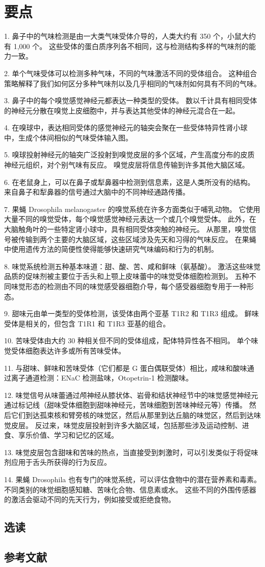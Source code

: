 \section{要点}

1. 鼻子中的气味检测是由一大类气味受体介导的，人类大约有 350 个，小鼠大约有 1,000 个。 这些受体的蛋白质序列各不相同，这与检测结构多样的气味剂的能力一致。 

2. 单个气味受体可以检测多种气味，不同的气味激活不同的受体组合。 这种组合策略解释了我们如何区分多种气味剂以及几乎相同的气味剂如何具有不同的气味。 

3. 鼻子中的每个嗅觉感觉神经元都表达一种类型的受体。 数以千计具有相同受体的神经元分散在嗅觉上皮细胞中，并与表达其他受体的神经元混合在一起。 

4. 在嗅球中，表达相同受体的感觉神经元的轴突会聚在一些受体特异性肾小球中，生成个体间相似的气味受体输入图。 

5. 嗅球投射神经元的轴突广泛投射到嗅觉皮层的多个区域，产生高度分布的皮质神经元组织，对个别气味有反应。 嗅觉皮层将信息传输到许多其他大脑区域。 

6. 在老鼠身上，可以在鼻子或犁鼻器中检测到信息素，这是人类所没有的结构。 来自鼻子和犁鼻器的信号通过大脑中的不同神经通路传播。 

7. 果蝇 Drosophila melanogaster 的嗅觉系统在许多方面类似于哺乳动物。 它使用大量不同的嗅觉受体，每个嗅觉感觉神经元表达一个或几个嗅觉受体。 此外，在大脑触角叶的一些特定肾小球中，具有相同受体突触的神经元。 从那里，嗅觉信号被传输到两个主要的大脑区域，这些区域涉及先天和习得的气味反应。 在果蝇中使用遗传方法的简便性使得能够快速研究气味编码和行为的机制。 

8. 味觉系统检测五种基本味道：甜、酸、苦、咸和鲜味（氨基酸）。 激活这些味觉品质的促味剂被主要位于舌头和上颚上皮味蕾中的味觉受体细胞检测到。 五种不同味觉形态的检测由不同的味觉感受器细胞介导，每个感受器细胞专用于一种形态。 

9. 甜味元由单一类型的受体检测，该受体由两个亚基 T1R2 和 T1R3 组成。 鲜味受体是相关的，但包含 T1R1 和 T1R3 亚基的组合。

10. 苦味受体由大约 30 种相关但不同的受体组成，配体特异性各不相同。 单个味觉受体细胞表达许多或所有苦味受体。 

11. 与甜味、鲜味和苦味受体（它们都是 G 蛋白偶联受体）相比，咸味和酸味通过离子通道检测：ENaC 检测盐味，Otopetrin-1 检测酸味。 

12. 味觉信号从味蕾通过颅神经从膝状体、岩骨和结状神经节中的味觉感觉神经元通过标记线（甜味受体细胞到甜味神经元，苦味细胞到苦味神经元等）传播。 然后它们到达孤束核和臂旁核的味觉区，然后从那里到达丘脑的味觉区，然后到达味觉皮层。 反过来，味觉皮层投射到许多大脑区域，包括那些涉及运动控制、进食、享乐价值、学习和记忆的区域。 

13. 味觉皮层包含甜味和苦味的热点，当直接受到刺激时，可以引发类似于将促味剂应用于舌头所获得的行为反应。 

14. 果蝇 Drosophila 也有专门的味觉系统，可以评估食物中的潜在营养素和毒素。 不同类别的味觉细胞感知糖、苦味化合物、信息素或水。 这些不同的外围传感器的激活会驱动不同的先天行为，例如接受或拒绝食物。



\subsection{选读}
\subsection{参考文献}